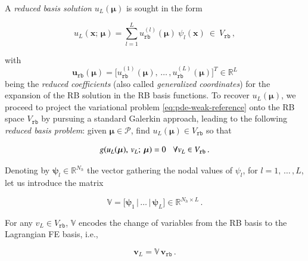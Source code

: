 \documentclass[longtitle]{elsarticle}
\numberwithin{equation}{section}
\theoremstyle{theorem}
\theoremstyle{definition}
\theoremstyle{remark}
\theoremstyle{proposition}
\numberwithin{figure}{section}
\newcommand{\bg}[1]{\boldsymbol{#1}}
\begin{document}
		A \emph{reduced basis solution} $u_{L}(\bg{\mu})$ is sought in the form
		\begin{linenomath}\begin{equation*}
			u_{L}(\bg{x}; \, \bg{\mu}) = \sum_{l = 1}^L u_{\texttt{rb}}^{(l)}(\bg{\mu}) ~ \psi_l(\bg{x}) ~ \in ~ V_{\texttt{rb}} \, ,
		\end{equation*}\end{linenomath}
		with \[ \mathbf{u}_{\texttt{rb}}(\bg{\mu}) = \big[ u_{\texttt{rb}}^{(1)}(\bg{\mu}), \, \ldots \, , u_{\texttt{rb}}^{(L)}(\bg{\mu}) \big]^T \in \mathbb{R}^L \] being the \emph{reduced coefficients} (also called \emph{generalized coordinates}) for the expansion of the RB solution in the RB basis functions. To recover $u_L(\bg{\mu})$, we proceed to project the variational problem \eqref{eq:pde-weak-reference} onto the RB space $V_{\texttt{rb}}$ by pursuing a standard Galerkin approach, leading to the following \emph{reduced basis problem}: given $\bg{\mu} \in \mathcal{P}$, find $u_L(\bg{\mu}) \in V_{\texttt{rb}}$ so that
		\begin{linenomath}\begin{linenomath}\begin{equation}
			\label{eq:pde-rb}
			g(u_L(\bg{\mu}), \, v_L; \, \bg{\mu}) = 0 \hspace*{0.3cm} \forall v_L \in V_{\texttt{rb}} \, .
		\end{equation}\end{linenomath}\end{linenomath}
		Denoting by $\bg{\psi}_l \in \mathbb{R}^{N_h}$ the vector gathering the nodal values of $\psi_l$, for $l = 1, \, \ldots \, , L$, let us introduce the matrix
		\begin{linenomath}\begin{equation*}
			\mathbb{V} = \big[ \bg{\psi}_1 \, \vert \, \ldots \, \vert \, \bg{\psi}_L \big] \in \mathbb{R}^{N_h \times L} \, .
		\end{equation*}\end{linenomath}
		For any $v_L \in V_{\texttt{rb}}$, $\mathbb{V}$ encodes the change of variables from the RB basis to the Lagrangian FE basis, i.e.,
		\begin{linenomath}\begin{linenomath}\begin{equation}
			\label{eq:change-of-variables}
			\mathbf{v}_L = \mathbb{V} \, \mathbf{v}_{\texttt{rb}} \, .
		\end{equation}\end{linenomath}\end{linenomath}
\end{document}
